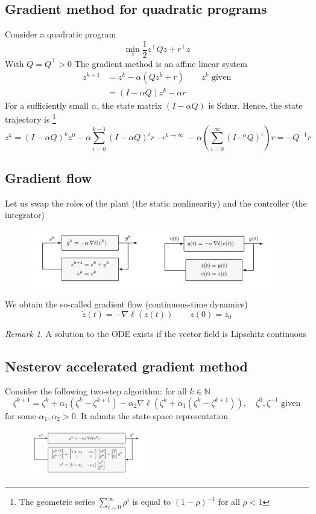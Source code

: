 \documentclass{book}
\newcommand{\N}{\mathbb{N}}
\theoremstyle{theoremv2}
\theoremstyle{defv2}
\theoremstyle{remark}
\newtheorem*{remark}{Remark}
\theoremstyle{remark}
\theoremstyle{definition}
\theoremstyle{definition}
\begin{document}
\subsection{Gradient method for quadratic programs}
Consider a quadratic program 
\[
    \min_z \displaystyle\frac{1}{2} z^\top Q z + r^\top z
\]
With $Q=Q^\top>0$
The gradient method is an affine linear system 
\begin{align*}
    z^{k+1} &= z^k -\alpha(Qz^k+r) \qquad z^k \text{ given}\\ 
    &= (I-\alpha Q) z^k - \alpha r
\end{align*}
For a sufficiently small $\alpha$, the state matrix $(I-\alpha Q)$ is Schur. Hence, the state trajectory is \footnote{The geometric series $\sum_{i=0}^{\infty}\rho^i$ is equal to $(1-\rho)^{-1}$ for all $\rho<1$} 
\[
    z^k = (I-\alpha Q)^kz^0 - \alpha \displaystyle\sum_{i=0}^{k-1}(I-\alpha Q)^ir \to^{k\to\infty} -\alpha\left(\displaystyle\sum_{i=0}^{\infty}(I-^\alpha Q)^i\right)r = -Q^{-1}r
\]
\subsection{Gradient flow}
Let us swap the roles of the plant (the static nonlinearity) and the controller (the integrator)
\begin{figure}[h]
    \center
    \includegraphics[width=0.95\textwidth]{figures/gradflow3}
\end{figure}
We obtain the so-called gradient flow (continuous-time dynamics)
\[
    \dot{z}(t) = -\nabla \ell(z(t)) \qquad z(0) = z_0
\]
\begin{remark}
    A solution to the ODE exists if the vector field is Lipschitz continuous
\end{remark}
\subsection{Nesterov accelerated gradient method}
Consider the following two-step algorithm: for all $k\in\N$
\[
    \zeta^{k+1} = \zeta^k + \alpha_1(\zeta^k-\zeta^{k+1}) - \alpha_2\nabla\ell \left(\zeta^k + \alpha_1(\zeta^k-\zeta^{k+1})\right), \quad \zeta^0, \zeta^{-1} \text{ given}
\]
for some $\alpha_1,\alpha_2>0$. It admits the state-space representation
\begin{figure}[H]
    \begin{center}
        \includegraphics[width=0.45\textwidth]{figures/nesterov.png}
    \end{center}
\end{figure}
\end{document}
